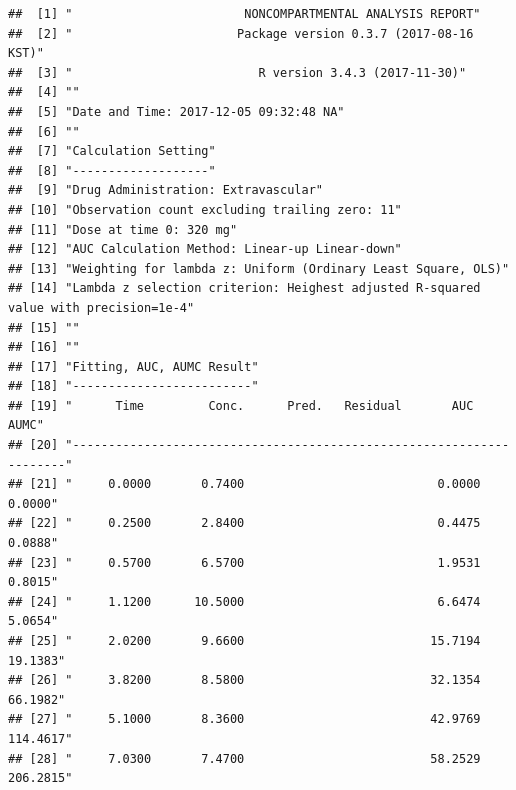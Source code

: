 \documentclass[9pt,]{krantz}
\begin{document}
\begin{verbatim}
##  [1] "                        NONCOMPARTMENTAL ANALYSIS REPORT"                           
##  [2] "                       Package version 0.3.7 (2017-08-16 KST)"                      
##  [3] "                          R version 3.4.3 (2017-11-30)"                             
##  [4] ""                                                                                   
##  [5] "Date and Time: 2017-12-05 09:32:48 NA"                                              
##  [6] ""                                                                                   
##  [7] "Calculation Setting"                                                                
##  [8] "-------------------"                                                                
##  [9] "Drug Administration: Extravascular"                                                 
## [10] "Observation count excluding trailing zero: 11"                                      
## [11] "Dose at time 0: 320 mg"                                                             
## [12] "AUC Calculation Method: Linear-up Linear-down"                                      
## [13] "Weighting for lambda z: Uniform (Ordinary Least Square, OLS)"                       
## [14] "Lambda z selection criterion: Heighest adjusted R-squared value with precision=1e-4"
## [15] ""                                                                                   
## [16] ""                                                                                   
## [17] "Fitting, AUC, AUMC Result"                                                          
## [18] "-------------------------"                                                          
## [19] "      Time         Conc.      Pred.   Residual       AUC       AUMC"                
## [20] "---------------------------------------------------------------------"              
## [21] "     0.0000       0.7400                           0.0000     0.0000"               
## [22] "     0.2500       2.8400                           0.4475     0.0888"               
## [23] "     0.5700       6.5700                           1.9531     0.8015"               
## [24] "     1.1200      10.5000                           6.6474     5.0654"               
## [25] "     2.0200       9.6600                          15.7194    19.1383"               
## [26] "     3.8200       8.5800                          32.1354    66.1982"               
## [27] "     5.1000       8.3600                          42.9769   114.4617"               
## [28] "     7.0300       7.4700                          58.2529   206.2815"               

\end{verbatim}
\end{document}
